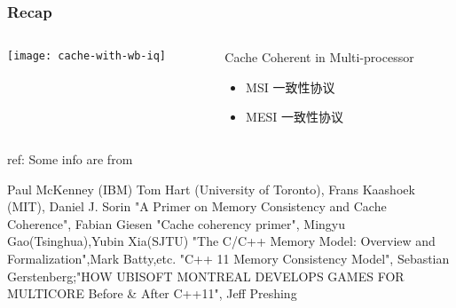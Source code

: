 %
%
\begin{frame}[plain]
	\frametitle{Recap }
	
	
	
	\begin{columns}
		
		\begin{column}{.5\textwidth}
			\centering
			
			\texttt{[image: cache-with-wb-iq]}

		\end{column}
		
		\begin{column}{.5\textwidth}
			
			\Large
            Cache Coherent in Multi-processor
			\begin{itemize}
				\item  MSI 一致性协议
				\item MESI 一致性协议
			
			\end{itemize}
			
		\end{column}
		
		
	\end{columns}
	
\tiny ref:
Some info are from

Paul McKenney (IBM) Tom Hart (University of Toronto), Frans Kaashoek (MIT), 
Daniel J. Sorin "A Primer on Memory Consistency and Cache Coherence", Fabian Giesen "Cache coherency primer", Mingyu Gao(Tsinghua),Yubin Xia(SJTU)
"The C/C++ Memory Model: Overview and Formalization",Mark Batty,etc. "C++ 11 Memory Consistency Model", Sebastian Gerstenberg;"HOW UBISOFT MONTREAL
DEVELOPS GAMES FOR MULTICORE Before \& After C++11", Jeff Preshing

	
\end{frame}


